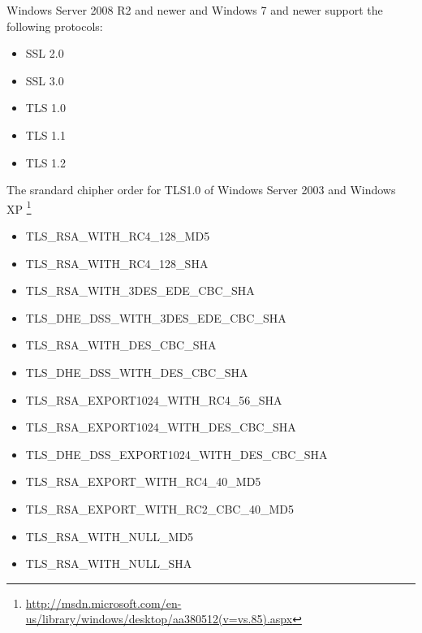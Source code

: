 Windows Server 2008 R2 and newer and Windows 7 and newer support the following protocols:
\begin{itemize}
\item SSL 2.0
\item SSL 3.0
\item TLS 1.0
\item TLS 1.1
\item TLS 1.2
\end{itemize}

The srandard chipher order for TLS1.0 of Windows Server 2003 and Windows XP \footnote{\url{http://msdn.microsoft.com/en-us/library/windows/desktop/aa380512(v=vs.85).aspx}}
\begin{itemize}
\item TLS_RSA_WITH_RC4_128_MD5
\item TLS_RSA_WITH_RC4_128_SHA
\item TLS_RSA_WITH_3DES_EDE_CBC_SHA
\item TLS_DHE_DSS_WITH_3DES_EDE_CBC_SHA
\item TLS_RSA_WITH_DES_CBC_SHA
\item TLS_DHE_DSS_WITH_DES_CBC_SHA
\item TLS_RSA_EXPORT1024_WITH_RC4_56_SHA
\item TLS_RSA_EXPORT1024_WITH_DES_CBC_SHA
\item TLS_DHE_DSS_EXPORT1024_WITH_DES_CBC_SHA
\item TLS_RSA_EXPORT_WITH_RC4_40_MD5
\item TLS_RSA_EXPORT_WITH_RC2_CBC_40_MD5
\item TLS_RSA_WITH_NULL_MD5
\item TLS_RSA_WITH_NULL_SHA
\end{itemize}

